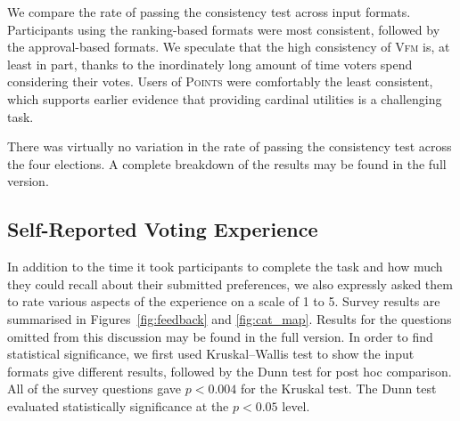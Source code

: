 \documentclass[letterpaper]{article} %
\newcommand{\kibitz}[2]{\ifnum\Comments=1{\color{#1}{#2}}\fi}
\newcommand{\rf}[1]{\kibitz{blue}{[Roy says:#1]}}
\newcommand{\gb}[1]{\kibitz{brown}{[GB:#1]}}
\newcommand{\points}{\textsc{Points}}
\newcommand{\vfm}{\textsc{Vfm}}
\begin{document}
We  compare the rate of passing the consistency test across input formats. 
Participants using the ranking-based formats were most consistent, followed by the approval-based formats.  We speculate that the high consistency of \vfm{} is, at least in part, thanks to the inordinately long amount of time voters spend considering their votes. Users of \points{} were comfortably the least consistent, which  supports earlier evidence that providing cardinal utilities is a challenging task.

There was virtually no variation in the rate of passing the consistency test across the four elections. A complete breakdown of the results may be found in the full version. 



\subsection{Self-Reported Voting Experience}
In addition to the time it took participants to complete the task and how much they could recall about their submitted preferences, we also expressly asked them to rate various aspects of the experience on a scale of 1 to 5. %
Survey results are summarised in  Figures~\ref{fig:feedback} and \ref{fig:cat_map}.
Results for the questions omitted from this discussion may be found in the full version.
In order to find statistical significance, we first used Kruskal–Wallis test to show the input formats give different results, followed by the Dunn test for post hoc comparison.
All of the survey questions   gave $p < 0.004$  for the Kruskal test. The Dunn test evaluated statistically significance   at the $p < 0.05$ level.
\end{document}
